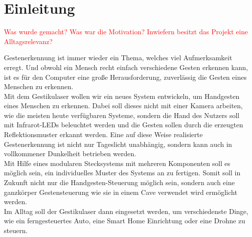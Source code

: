 \chapter{Einleitung}
\label{ch:Einleitung}

\textcolor{red}{Was wurde gemacht? Was war die Motivation? Inwiefern besitzt das Projekt eine Alltagsrelevanz?}

Gestenerkennung ist immer wieder ein Thema, welches viel Aufmerksamkeit erregt. Und obwohl ein Mensch recht einfach verschiedene Gesten erkennen kann, ist es für den Computer eine große Herausforderung, zuverlässig die Gesten eines Menschen zu erkennen. \\
Mit dem Gestikulaser wollen wir ein neues System entwickeln, um Handgesten eines Menschen zu erkennen. Dabei soll dieses nicht mit einer Kamera arbeiten, wie die meisten heute verfügbaren Systeme, sondern die Hand des Nutzers soll mit Infrarot-LEDs beleuchtet werden und die Gesten sollen durch die erzeugten Reflektionsmuster erkannt werden. Eine auf diese Weise realisierte Gestenerkennung ist nicht nur Tageslicht unabhängig, sondern kann auch in vollkommener Dunkelheit betrieben werden. \\
Mit Hilfe eines modularen Stecksystems mit mehreren Komponenten soll es möglich sein, ein individuelles Muster des Systems an zu fertigen. Somit soll in Zukunft nicht nur die Handgesten-Steuerung möglich sein, sondern auch eine ganzkörper Gestensteuerung wie sie in einem Cave verwendet wird ermöglicht werden. \\

Im Alltag soll der Gestikulaser dann eingesetzt werden, um verschiedenste Dinge, wie ein ferngesteuertes Auto, eine Smart Home Einrichtung oder eine Drohne zu steuern. 